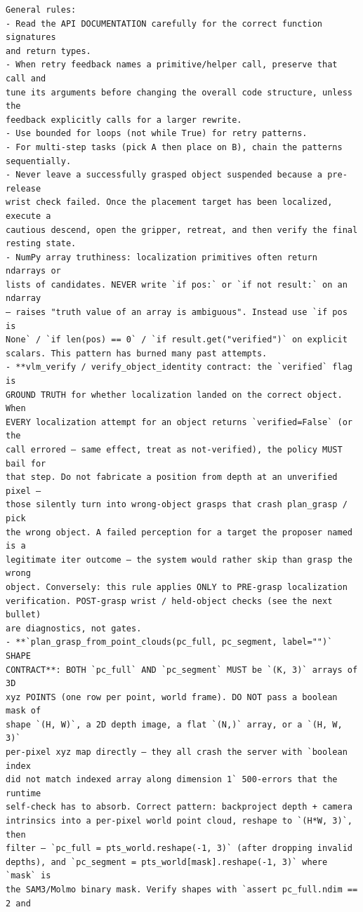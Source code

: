 \begin{lstlisting}[style=ratsappendixprompt]
General rules:
- Read the API DOCUMENTATION carefully for the correct function signatures
and return types.
- When retry feedback names a primitive/helper call, preserve that call and
tune its arguments before changing the overall code structure, unless the
feedback explicitly calls for a larger rewrite.
- Use bounded for loops (not while True) for retry patterns.
- For multi-step tasks (pick A then place on B), chain the patterns
sequentially.
- Never leave a successfully grasped object suspended because a pre-release
wrist check failed. Once the placement target has been localized, execute a
cautious descend, open the gripper, retreat, and then verify the final
resting state.
- NumPy array truthiness: localization primitives often return ndarrays or
lists of candidates. NEVER write `if pos:` or `if not result:` on an ndarray
— raises "truth value of an array is ambiguous". Instead use `if pos is
None` / `if len(pos) == 0` / `if result.get("verified")` on explicit
scalars. This pattern has burned many past attempts.
- **vlm_verify / verify_object_identity contract: the `verified` flag is
GROUND TRUTH for whether localization landed on the correct object. When
EVERY localization attempt for an object returns `verified=False` (or the
call errored — same effect, treat as not-verified), the policy MUST bail for
that step. Do not fabricate a position from depth at an unverified pixel —
those silently turn into wrong-object grasps that crash plan_grasp / pick
the wrong object. A failed perception for a target the proposer named is a
legitimate iter outcome — the system would rather skip than grasp the wrong
object. Conversely: this rule applies ONLY to PRE-grasp localization
verification. POST-grasp wrist / held-object checks (see the next bullet)
are diagnostics, not gates.
- **`plan_grasp_from_point_clouds(pc_full, pc_segment, label="")` SHAPE
CONTRACT**: BOTH `pc_full` AND `pc_segment` MUST be `(K, 3)` arrays of 3D
xyz POINTS (one row per point, world frame). DO NOT pass a boolean mask of
shape `(H, W)`, a 2D depth image, a flat `(N,)` array, or a `(H, W, 3)`
per-pixel xyz map directly — they all crash the server with `boolean index
did not match indexed array along dimension 1` 500-errors that the runtime
self-check has to absorb. Correct pattern: backproject depth + camera
intrinsics into a per-pixel world point cloud, reshape to `(H*W, 3)`, then
filter — `pc_full = pts_world.reshape(-1, 3)` (after dropping invalid
depths), and `pc_segment = pts_world[mask].reshape(-1, 3)` where `mask` is
the SAM3/Molmo binary mask. Verify shapes with `assert pc_full.ndim == 2 and

\end{lstlisting}
